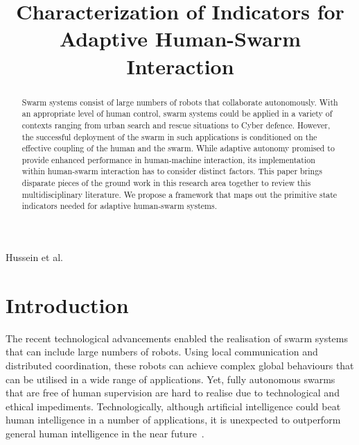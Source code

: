 \documentclass[journal]{IEEEtran}
\begin{document}
\title{Characterization of Indicators for Adaptive Human-Swarm Interaction}

\author{
}
%
{Hussein et al.}
\maketitle
\begin{abstract}
Swarm systems consist of large numbers of robots that collaborate autonomously. 
With an appropriate level of human control, swarm systems could be applied in a variety of contexts ranging from urban search and rescue situations to Cyber defence. 
However, the successful deployment of the swarm in such applications is conditioned on the effective coupling of the human and the swarm. 
While adaptive autonomy promised to provide enhanced performance in human-machine interaction, its implementation within human-swarm interaction has to consider distinct factors. 
This paper brings disparate pieces of the ground work in this research area together to review this multidisciplinary literature. 
We propose a framework that maps out the primitive state indicators needed for  adaptive human-swarm systems.
\end{abstract}


\section{Introduction}
The recent technological advancements enabled the realisation of swarm systems that can include large numbers of robots. 
Using local communication and distributed coordination, these robots can achieve complex global behaviours that can be utilised in a wide range of applications. 
Yet, fully autonomous swarms that are free of human supervision are hard to realise due to technological and ethical impediments. 
Technologically, although artificial intelligence could beat human intelligence in a number of applications, it is unexpected to outperform general human intelligence in the near future~\cite{should}. 
\end{document}
